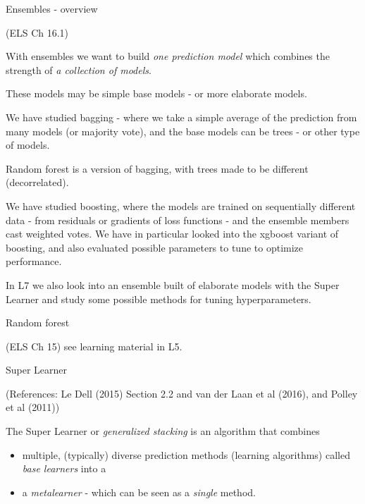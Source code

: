 \documentclass[
  ignorenonframetext,
]{beamer}
\providecommand{\tightlist}{%
  \setlength{\itemsep}{0pt}\setlength{\parskip}{0pt}}
\begin{document}
\begin{frame}{Ensembles - overview}
\protect\hypertarget{ensembles---overview}{}

(ELS Ch 16.1)

With ensembles we want to build \emph{one prediction model} which
combines the strength of \emph{a collection of models}.

These models may be simple base models - or more elaborate models.

We have studied bagging - where we take a simple average of the
prediction from many models (or majority vote), and the base models can
be trees - or other type of models.

Random forest is a version of bagging, with trees made to be different
(decorrelated).

We have studied boosting, where the models are trained on sequentially
different data - from residuals or gradients of loss functions - and the
ensemble members cast weighted votes. We have in particular looked into
the xgboost variant of boosting, and also evaluated possible parameters
to tune to optimize performance.

In L7 we also look into an ensemble built of elaborate models with the
Super Learner and study some possible methods for tuning
hyperparameters.

\end{frame}

\begin{frame}{Random forest}
\protect\hypertarget{random-forest}{}

(ELS Ch 15) see learning material in L5.

\end{frame}

\begin{frame}{Super Learner}
\protect\hypertarget{super-learner}{}

(References: Le Dell (2015) Section 2.2 and van der Laan et al (2016),
and Polley et al (2011))

The Super Learner or \emph{generalized stacking} is an algorithm that
combines

\begin{itemize}
\tightlist
\item
  multiple, (typically) diverse prediction methods (learning algorithms)
  called \emph{base learners} into a
\item
  a \emph{metalearner} - which can be seen as a \emph{single} method.
\end{itemize}

\end{frame}
\end{document}
